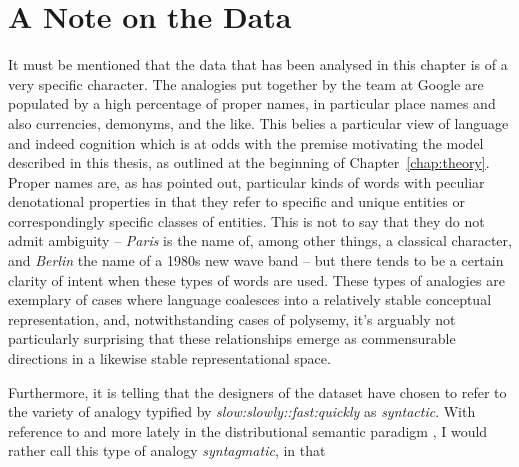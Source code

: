 \begin{figure}
\end{figure}

\section{A Note on the Data}
It must be mentioned that the data that has been analysed in this chapter is of a very specific character.  The analogies put together by the team at Google are populated by a high percentage of proper names, in particular place names and also currencies, demonyms, and the like.  This belies a particular view of language and indeed cognition which is at odds with the premise motivating the model described in this thesis, as outlined at the beginning of Chapter~\ref{chap:theory}.  Proper names are, as \cite{Russell} has pointed out, particular kinds of words with peculiar denotational properties in that they refer to specific and unique entities or correspondingly specific classes of entities.  This is not to say that they do not admit ambiguity -- \emph{Paris} is the name of, among other things, a classical character, and \emph{Berlin} the name of a 1980s new wave band -- but there tends to be a certain clarity of intent when these types of words are used.  These types of analogies are exemplary of cases where language coalesces into a relatively stable conceptual representation, and, notwithstanding cases of polysemy, it's arguably not particularly surprising that these relationships emerge as commensurable directions in a likewise stable representational space.

Furthermore, it is telling that the designers of the dataset have chosen to refer to the variety of analogy typified by \emph{slow:slowly::fast:quickly} as \emph{syntactic}.  With reference to \cite{Saussure} and more lately in the distributional semantic paradigm \cite{Sahlgren}, I would rather call this type of analogy \emph{syntagmatic}, in that 
